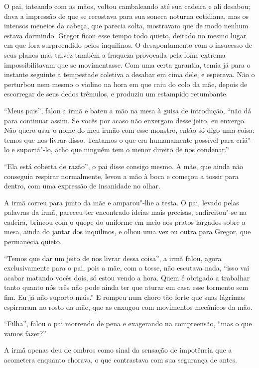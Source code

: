 O pai, tateando com as mãos, voltou cambaleando até sua cadeira e ali
desabou; dava a impressão de que se recostava para sua soneca noturna
cotidiana, mas os intensos meneios da cabeça, que parecia solta, mostravam
que de modo nenhum estava dormindo. Gregor ficou esse tempo todo quieto,
deitado no mesmo lugar em que fora surpreendido pelos inquilinos. O
desapontamento com o insucesso de seus planos mas talvez também a fraqueza
provocada pela fome extrema impossibilitavam que se movimentasse. Com uma
certa garantia, temia já para o instante seguinte a tempestade coletiva a
desabar em cima dele, e esperava. Não o perturbou nem mesmo o violino na
hora em que caiu do colo da mãe, depois de escorregar de seus dedos
trêmulos, e produziu um estampido retumbante.

“Meus pais”, falou a irmã e bateu a mão na mesa à guisa de introdução,
“não dá para continuar assim. Se vocês por acaso não enxergam desse jeito,
eu enxergo. Não quero usar o nome do meu irmão com esse monstro, então só
digo uma coisa: temos que nos livrar disso. Tentamos o que era humanamente
possível para criá"-lo e suportá"-lo, acho que ninguém tem o menor direito
de nos condenar.”

“Ela está coberta de razão”, o pai disse consigo mesmo. A mãe, que ainda
não conseguia respirar normalmente, levou a mão à boca e começou a tossir
para dentro, com uma expressão de insanidade no olhar.

A irmã correu para junto da mãe e amparou"-lhe a testa. O pai, levado pelas
palavras da irmã, pareceu ter encontrado ideias mais precisas,
endireitou"-se na cadeira, brincou com o quepe do uniforme em meio aos
pratos largados sobre a mesa, ainda do jantar dos inquilinos, e olhou uma
vez ou outra para Gregor, que permanecia quieto.

“Temos que dar um jeito de nos livrar dessa coisa”, a irmã falou, agora
exclusivamente para o pai, pois a mãe, com a tosse, não escutava nada,
“isso vai acabar matando vocês dois, só estou vendo a hora. Quem é
obrigado a trabalhar tanto quanto nós três não pode ainda ter que aturar
em casa esse tormento sem fim. Eu já não suporto mais.” E rompeu num choro
tão forte que suas lágrimas espirraram no rosto da mãe, que as enxugou com
movimentos mecânicos da mão.

“Filha”, falou o pai morrendo de pena e exagerando na compreensão, “mas o
que vamos fazer?”

A irmã apenas deu de ombros como sinal da sensação de impotência que a
acometera enquanto chorava, o que contrastava com sua segurança de antes.

